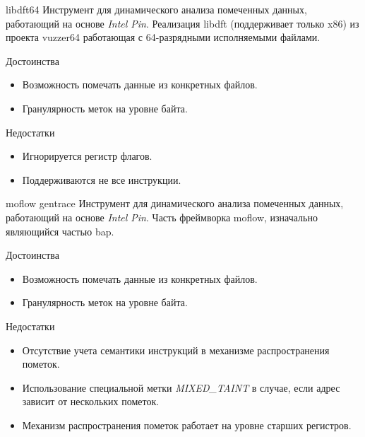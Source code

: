 \documentclass[10pt]{beamer}
\begin{document}
\begin{frame}{libdft64}
    Инструмент для динамического анализа помеченных данных, работающий на основе \emph{Intel Pin}. Реализация libdft (поддерживает только x86) из проекта vuzzer64 работающая с 64-разрядными исполняемыми файлами. 
    \begin{block}{Достоинства}
      \begin{itemize}
        \item Возможность помечать данные из конкретных файлов.
        \item Гранулярность меток на уровне байта.
      \end{itemize}
    \end{block}
        \begin{block}{Недостатки}
          \begin{itemize}
      \item Игнорируется регистр флагов.
      \item Поддерживаются не все инструкции.
      \end{itemize}
    \end{block}
\end{frame}


\begin{frame}{moflow gentrace}
    Инструмент для динамического анализа помеченных данных, работающий на основе \emph{Intel Pin}.
    Часть фреймворка moflow, изначально являющийся частью bap.
    \begin{block}{Достоинства}
      \begin{itemize}
        \item Возможность помечать данные из конкретных файлов.
        \item Гранулярность меток на уровне байта.
      \end{itemize}
    \end{block}
        \begin{block}{Недостатки}
          \begin{itemize}
      \item Отсутствие учета семантики инструкций в механизме распространения пометок.
      \item Использование специальной метки \emph{MIXED\_TAINT} в случае, если адрес зависит от нескольких пометок.
      \item Механизм распространения пометок работает на уровне старших регистров.
      \end{itemize}
    \end{block}
\end{frame}
\end{document}
